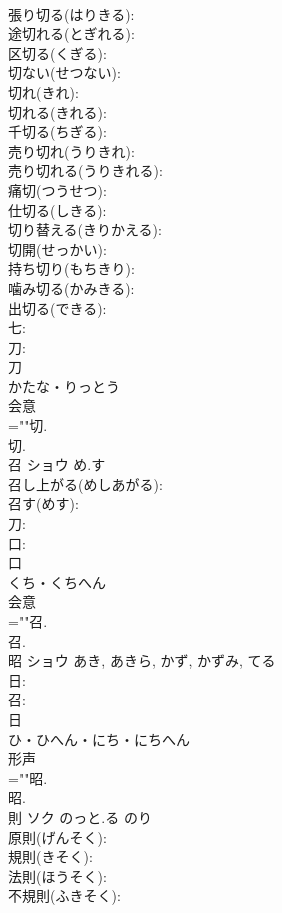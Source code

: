 \documentclass[8pt]{extreport}
\begin{document}
\begin{CJK}{UTF8}{min}
\\	張り切る(はりきる): 
\\	途切れる(とぎれる): 
\\	区切る(くぎる): 
\\	切ない(せつない): 
\\	切れ(きれ): 
\\	切れる(きれる): 
\\	千切る(ちぎる): 
\\	売り切れ(うりきれ): 
\\	売り切れる(うりきれる): 
\\	痛切(つうせつ): 
\\	仕切る(しきる): 
\\	切り替える(きりかえる): 
\\	切開(せっかい): 
\\	持ち切り(もちきり): 
\\	噛み切る(かみきる): 
\\	出切る(できる): 
\\	七: 
\\	刀: 
\\	刀	
\\	かたな・りっとう	
\\	会意 
\\	=""切.
\\	切.
\\	召	ショウ	め.す		
\\	召し上がる(めしあがる): 
\\	召す(めす): 
\\	刀: 
\\	口: 
\\	口	
\\	くち・くちへん	
\\	会意 
\\	=""召.
\\	召.
\\	昭	ショウ		あき, あきら, かず, かずみ, てる	
\\	日: 
\\	召: 
\\	日	
\\	ひ・ひへん・にち・にちへん	
\\	形声 
\\	=""昭.
\\	昭.
\\	則	ソク	のっと.る	のり	
\\	原則(げんそく): 
\\	規則(きそく): 
\\	法則(ほうそく): 
\\	不規則(ふきそく): 

\end{CJK}
\end{document}
